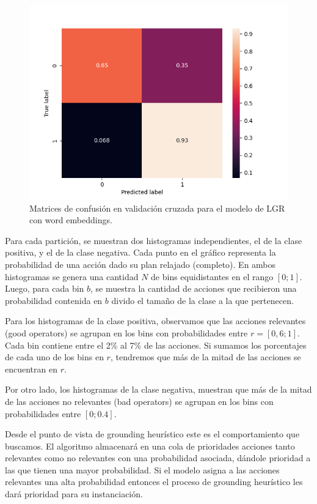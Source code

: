 \begin{figure}[b!]
      \includegraphics[width=\linewidth]{figures/results/word_embeddings/lgr/take_image/lgr_set_5_confusion_matrix_percent.png}
    \endminipage
    \caption{Matrices de confusión en validación cruzada para el modelo de LGR con word embeddings.}
    \label{fig:takeimage-bestmodel-cm}
\end{figure}

Para cada partición, se muestran dos histogramas independientes, el de la clase
positiva, y el de la clase negativa. Cada punto en el gráfico representa la
probabilidad de una acción dado su plan relajado (completo). En ambos
histogramas se genera una cantidad $N$ de bins equidistantes en el rango
$[0;1]$. Luego, para cada bin $b$, se muestra la cantidad de acciones que
recibieron una probabilidad contenida en $b$ divido el tamaño de la clase a la
que pertenecen.

Para los histogramas de la clase positiva, observamos que las acciones
relevantes (good operators) se agrupan en los bins con probabilidades entre
$r=[0,6; 1]$. Cada bin contiene entre el 2\% al 7\% de las acciones. Si sumamos
los porcentajes de cada uno de los bins en $r$, tendremos que más de la mitad de
las acciones se encuentran en $r$.

Por otro lado, los histogramas de la clase negativa, muestran que más de la
mitad de las acciones no relevantes (bad operators) se agrupan en los bins con
probabilidades entre $[0;0.4]$.

Desde el punto de vista de grounding heurístico este es el comportamiento que
buscamos. El algoritmo almacenará en una cola de prioridades acciones tanto
relevantes como no relevantes con una probabilidad asociada, dándole prioridad a
las que tienen una mayor probabilidad. Si el modelo asigna a las acciones
relevantes una alta probabilidad entonces el proceso de grounding heurístico les
dará prioridad para su instanciación.

